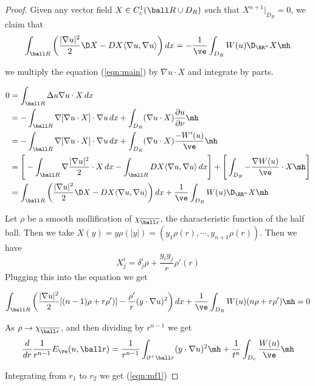 \begin{proof}
    
Given any vector field $X \in C_c^1(\ball R \cup D_R)$ such that $X^{n+1}|_{D_R}=0$, we claim that 
\begin{equation} \label{eqn:fv}
    \int_{\ball R} \bigg( \frac{|\nabla u|^2}{2} \D X - DX \langle \nabla u, \nabla u \rangle \bigg)\,dx =- \frac{1}{\ve}\int_{D_R} W(u) \D_{\RR^n} X \mh 
\end{equation}

we multiply the equation (\ref{eqn:main}) by $\nabla u \cdot X$ and integrate by parts. 

\begin{align}
    0 &= \int_{\ball R} \Delta u \nabla u 
    \cdot X \,dx \\
    &= -\int_{\ball R} \nabla[\nabla u \cdot X] \cdot \nabla u \,dx + \int_{D_R} (\nabla u \cdot X)\frac{\partial u}{\partial \nu} \mh \label{ibp}  \\
    &= -\int_{\ball R} \nabla[\nabla u \cdot X] \cdot \nabla u \,dx + \int_{D_R} (\nabla u \cdot X)\frac{-W'(u)}{\ve} \mh \\
    &= \Bigg[-\int_{\ball R} \nabla\frac{|\nabla u|^2}{2} \cdot X \,dx -\int_{\ball R} DX \langle \nabla u, \nabla u \rangle\,dx \Bigg] + \Bigg[\int_{D_R} -\frac{\nabla W(u)}{\ve} \cdot X \mh \Bigg] \\
    &= \int_{\ball R} \bigg( \frac{|\nabla u|^2}{2} \D X - DX \langle \nabla u, \nabla u \rangle\bigg)\,dx + \frac{1}{\ve}\int_{D_R} W(u) \D_{\RR^n} X \mh  
\end{align}

Let $\rho$ be a smooth mollification of $\chi_{\overline{\ball r}}$, the characteristic function of the half ball. Then we take $X(y) = y\rho(|y|)=(y_1\rho(r), \cdots,y_{n+1}\rho(r))$. Then we have 
$$ X^i_j = \delta^i_j \rho + \frac{y_i y_j}{r}\rho '(r)$$ Plugging this into the equation we get 

\begin{equation}
    \int_{\ball R} \bigg( \frac{|\nabla u|^2}{2}[(n-1)\rho+r\rho ')] - \frac{\rho '}{r}(y\cdot \nabla u)^2\bigg)\,dx + \frac{1}{\ve}\int_{D_R} W(u)(n\rho + r \rho ') \mh = 0
\end{equation}

As $\rho \to \chi_{\overline{\ball r}}$, and then dividing by $r^{n-1}$ we get
\begin{equation} \label{eqn:mf}
    \frac{d}{dr} \frac{1}{r^{n-1}} E_{\ve}(u, \ball r) = \frac{1}{r^{n-1}} \int_{\partial ^+ \ball r} (y\cdot \nabla u)^2 \mh + \frac{1}{t^n} \int_{D_r}\frac{W(u)}{\ve} \mh 
\end{equation}

Integrating from $r_1$ to $r_2$ we get (\ref{eqn:mf1})
\end{proof}

